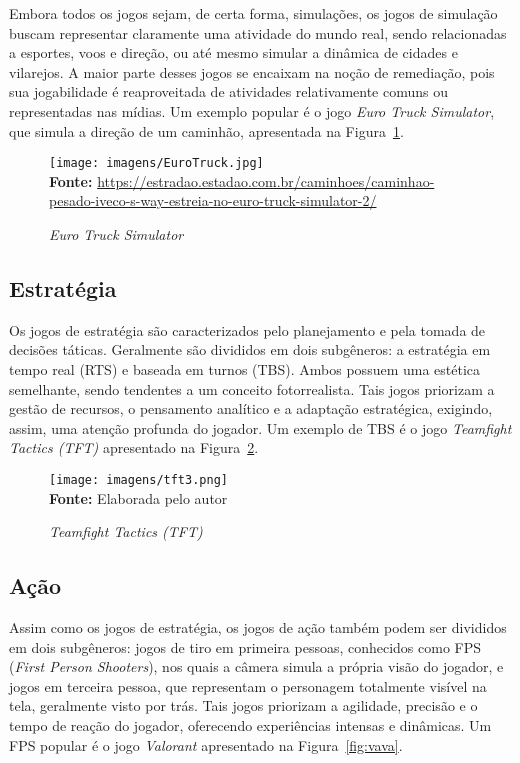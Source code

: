 Embora todos os jogos sejam, de certa forma, simulações, os jogos de simulação buscam representar claramente uma atividade do mundo real, sendo relacionadas a esportes, voos e direção, ou até mesmo simular a dinâmica de cidades e vilarejos. A maior parte desses jogos se encaixam na noção de remediação, pois sua jogabilidade é reaproveitada de atividades relativamente comuns ou representadas nas mídias. Um exemplo popular é o jogo \textit{Euro Truck Simulator}, que simula a direção de um caminhão, apresentada na Figura~\ref{fig:simulacao}.


\FloatBarrier 
\begin{figure}[!htbp]
	\centering
	\caption{\textit{Euro Truck Simulator}}
	\texttt{[image: imagens/EuroTruck.jpg]}
	\\\textbf{Fonte:} \url{https://estradao.estadao.com.br/caminhoes/caminhao-pesado-iveco-s-way-estreia-no-euro-truck-simulator-2/ }
	\label{fig:simulacao}
\end{figure}
\FloatBarrier


\subsection{Estratégia}

Os jogos de estratégia são caracterizados pelo planejamento e pela tomada de decisões táticas. Geralmente são divididos em dois subgêneros: a estratégia em tempo real (RTS) e baseada em turnos (TBS). Ambos possuem uma estética semelhante, sendo tendentes a um conceito fotorrealista. Tais jogos priorizam a gestão de recursos, o pensamento analítico e a adaptação estratégica, exigindo, assim, uma atenção profunda do jogador. Um exemplo de TBS é o jogo \textit{Teamfight Tactics (TFT)} apresentado na Figura~\ref{fig:tactics}.

\FloatBarrier 
\begin{figure}[!htbp]
	\centering
	\caption{\textit{Teamfight Tactics (TFT)}}
	\texttt{[image: imagens/tft3.png]}
	\\\textbf{Fonte:} Elaborada pelo autor
	\label{fig:tactics}
\end{figure}
\FloatBarrier


\subsection{Ação}

Assim como os jogos de estratégia, os jogos de ação também podem ser divididos em dois subgêneros: jogos de tiro em primeira pessoas, conhecidos como FPS (\textit{First Person Shooters}), nos quais a câmera simula a própria visão do jogador, e jogos em terceira pessoa, que representam o personagem totalmente visível na tela, geralmente visto por trás. Tais jogos priorizam a agilidade, precisão e o tempo de reação do jogador, oferecendo experiências intensas e dinâmicas. Um FPS popular é o jogo \textit{Valorant} apresentado na Figura~\ref{fig:vava}.


